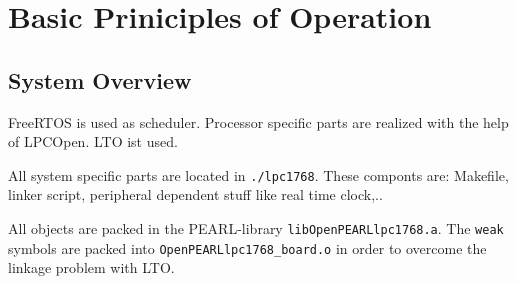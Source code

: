 \section{Basic Priniciples of Operation}

\subsection{System Overview}
FreeRTOS is used as scheduler. Processor specific parts are
realized with the help of LPCOpen. LTO ist used.

All system specific parts are located in \texttt{./lpc1768}. 
These componts are:
Makefile, linker script, peripheral dependent stuff like real time clock,..

All objects are packed in the PEARL-library 
\verb|libOpenPEARLlpc1768.a|. The \texttt{weak} symbols are
packed into \texttt{OpenPEARLlpc1768\_board.o} in order to overcome the 
linkage problem with LTO.

